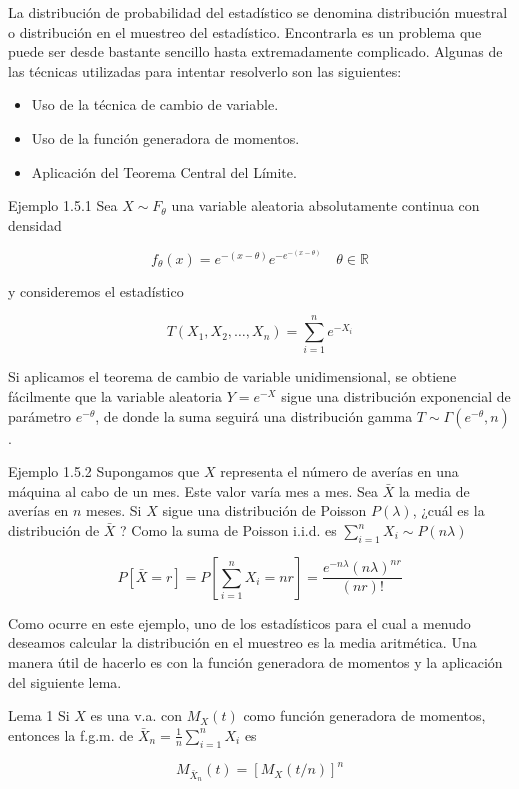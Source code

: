 \documentclass[
]{article}
\providecommand{\tightlist}{%
  \setlength{\itemsep}{0pt}\setlength{\parskip}{0pt}}
\begin{document}
La distribución de probabilidad del estadístico se denomina distribución muestral o distribución en el muestreo del estadístico. Encontrarla es un problema que puede ser desde bastante sencillo hasta extremadamente complicado. Algunas de las técnicas utilizadas para intentar resolverlo son las siguientes:

\begin{itemize}
\tightlist
\item
  Uso de la técnica de cambio de variable.
\item
  Uso de la función generadora de momentos.
\item
  Aplicación del Teorema Central del Límite.
\end{itemize}

Ejemplo 1.5.1 Sea \(X \sim F_{\theta}\) una variable aleatoria absolutamente continua con densidad

\[
f_{\theta}(x)=e^{-(x-\theta)} e^{-e^{-(x-\theta)}} \quad \theta \in \mathbb{R}
\]

y consideremos el estadístico

\[
T\left(X_{1}, X_{2}, \ldots, X_{n}\right)=\sum_{i=1}^{n} e^{-X_{i}}
\]

Si aplicamos el teorema de cambio de variable unidimensional, se obtiene fácilmente que la variable aleatoria \(Y=e^{-X}\) sigue una distribución exponencial de parámetro \(e^{-\theta}\), de donde la suma seguirá una distribución gamma \(T \sim \Gamma\left(e^{-\theta}, n\right)\).

Ejemplo 1.5.2 Supongamos que \(X\) representa el número de averías en una máquina al cabo de un mes. Este valor varía mes a mes. Sea \(\bar{X}\) la media de averías en \(n\) meses. Si \(X\) sigue una distribución de Poisson \(P(\lambda)\), ¿cuál es la distribución de \(\bar{X}\) ?
Como la suma de Poisson i.i.d. es \(\sum_{i=1}^{n} X_{i} \sim P(n \lambda)\)

\[
P[\bar{X}=r]=P\left[\sum_{i=1}^{n} X_{i}=n r\right]=\frac{e^{-n \lambda}(n \lambda)^{n r}}{(n r)!}
\]

Como ocurre en este ejemplo, uno de los estadísticos para el cual a menudo deseamos calcular la distribución en el muestreo es la media aritmética. Una manera útil de hacerlo es con la función generadora de momentos y la aplicación del siguiente lema.

Lema 1 Si \(X\) es una v.a. con \(M_{X}(t)\) como función generadora de momentos, entonces la f.g.m. de \(\bar{X}_{n}=\frac{1}{n} \sum_{i=1}^{n} X_{i}\) es

\[
M_{\bar{X}_{n}}(t)=\left[M_{X}(t / n)\right]^{n}
\]
\end{document}
